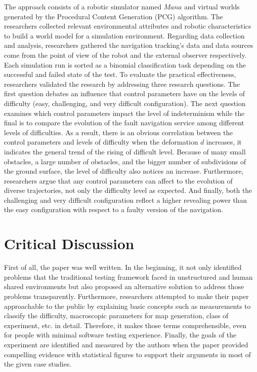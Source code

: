 \documentclass[10pt,a4paper]{report}
\begin{document}
The approach consists of a robotic simulator named $Mana$ and virtual worlds generated by the Procedural Content Generation (PCG) algorithm. 
%
The researchers collected relevant environmental attributes and robotic characteristics to build a world model for a simulation environment.
%
Regarding data collection and analysis, researchers gathered the navigation tracking's data and data sources come from the point of view of the robot and the external observer respectively.
%
Each simulation run is sorted as a binomial classification task depending on the successful and failed state of the test.
%
To evaluate the practical effectiveness, researchers validated the research by addressing three research questions.
%
The first question debates an influence that control parameters have on the levels of difficulty (easy, challenging, and very difficult configuration).
%
The next question examines which control parameters impact the level of indeterminism while the final is to compare the evolution of the fault navigation service among different levels of difficulties.
%
As a result, there is an obvious correlation between the control parameters and levels of difficulty when the deformation $d$ increases, it indicates the general trend of the rising of difficult level.
%
Because of many small obstacles, a large number of obstacles, and the bigger number of subdivisions of the ground surface, the level of difficulty also notices an increase.
%
Furthermore, researchers argue that any control parameters can affect to the evolution of diverse trajectories, not only the difficulty level as expected.
%
And finally, both the challenging and very difficult configuration reflect a higher revealing power than the easy configuration with respect to a faulty version of the navigation.



\section{Critical Discussion}
First of all, the paper was well written. In the beginning, it not only identified problems that the traditional testing framework faced in unstructured and human shared environments but also proposed an alternative solution to address those problems transparently.
%
Furthermore, researchers attempted to make their paper approachable to the public by explaining basic concepts such as measurements to classify the difficulty, macroscopic parameters for map generation, class of experiment, etc. in detail. Therefore, it makes those terms comprehensible, even for people with minimal software testing experience.  
%
Finally, the goals of the experiment are identified and measured by the authors when the paper provided compelling evidence with statistical figures to support their arguments in most of the given case studies.
%
\end{document}
